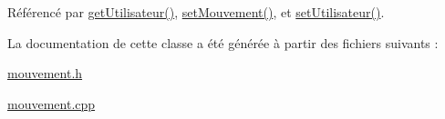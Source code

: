 Référencé par \hyperlink{class_mouvement_a80c65d0cba3e7918f7112fd7f85a1471}{get\+Utilisateur()}, \hyperlink{class_mouvement_a5c7f0e876b2292627e9d1bef12de03a3}{set\+Mouvement()}, et \hyperlink{class_mouvement_abd38b265d54e55a4dd897e3270141a84}{set\+Utilisateur()}.



La documentation de cette classe a été générée à partir des fichiers suivants \+:\begin{DoxyCompactItemize}
\item 
\hyperlink{mouvement_8h}{mouvement.\+h}\item 
\hyperlink{mouvement_8cpp}{mouvement.\+cpp}\end{DoxyCompactItemize}

